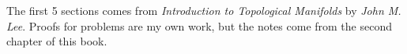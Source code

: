 The first 5 sections comes from \emph{Introduction to Topological Manifolds} 
by \emph{John M. Lee}. Proofs for problems are my own work, but the notes come 
from the second chapter of this book.




